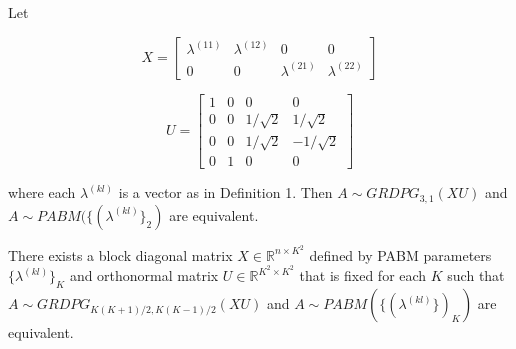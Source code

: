 \documentclass[
  11pt,
]{article}
\begin{document}
\begin{theorem}[Connecting the PABM to the GRDPG for $K = 2$]
\label{theorem1}  
Let 

$$X = \begin{bmatrix} 
\lambda^{(11)} & \lambda^{(12)} & 0 & 0 \\ 
0 & 0 & \lambda^{(21)} & \lambda^{(22)} 
\end{bmatrix}$$

$$U = \begin{bmatrix} 1 & 0 & 0 & 0 \\
0 & 0 & 1 / \sqrt{2} & 1 / \sqrt{2} \\
0 & 0 & 1 / \sqrt{2} & - 1 / \sqrt{2} \\
0 & 1 & 0 & 0 \end{bmatrix}$$

where each $\lambda^{(kl)}$ is a vector as in Definition 1. 
Then $A \sim GRDPG_{3, 1}(X U)$ and $A \sim PABM(\{(\lambda^{(kl)}\}_2)$ are 
equivalent.
\end{theorem}

\begin{theorem}[Generalization to $K > 2$] 
\label{theorem2}
There exists a block diagonal matrix 
$X \in \mathbb{R}^{n \times K^2}$ defined by PABM parameters 
$\{\lambda^{(kl)}\}_K$ and orthonormal matrix 
$U \in \mathbb{R}^{K^2 \times K^2}$ that is fixed 
for each $K$ such that $A \sim GRDPG_{K (K+1) / 2, K (K-1) / 2}(XU)$ and 
$A \sim PABM(\{(\lambda^{(kl)}\})_K)$ are equivalent.
\end{theorem}
\end{document}
